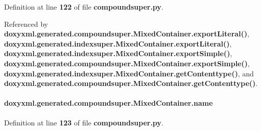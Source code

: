 Definition at line {\bf 122} of file {\bf compoundsuper.\+py}.



Referenced by {\bf doxyxml.\+generated.\+compoundsuper.\+Mixed\+Container.\+export\+Literal()}, {\bf doxyxml.\+generated.\+indexsuper.\+Mixed\+Container.\+export\+Literal()}, {\bf doxyxml.\+generated.\+indexsuper.\+Mixed\+Container.\+export\+Simple()}, {\bf doxyxml.\+generated.\+compoundsuper.\+Mixed\+Container.\+export\+Simple()}, {\bf doxyxml.\+generated.\+indexsuper.\+Mixed\+Container.\+get\+Contenttype()}, and {\bf doxyxml.\+generated.\+compoundsuper.\+Mixed\+Container.\+get\+Contenttype()}.

\paragraph[{name}]{\setlength{\rightskip}{0pt plus 5cm}doxyxml.\+generated.\+compoundsuper.\+Mixed\+Container.\+name}\label{classdoxyxml_1_1generated_1_1compoundsuper_1_1MixedContainer_a7140f0276132059887e85e5b4e53d226}


Definition at line {\bf 123} of file {\bf compoundsuper.\+py}.



